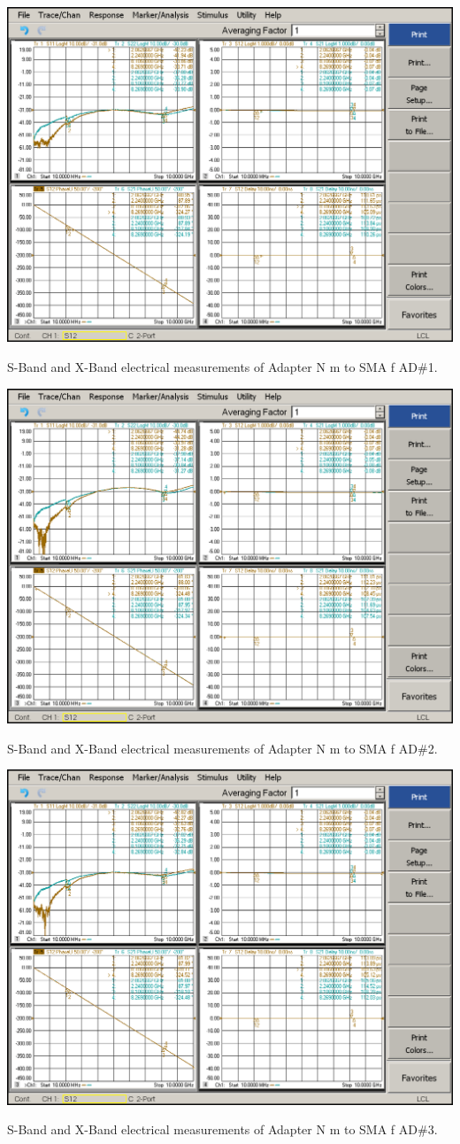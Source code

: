 \begin{table}[H]
	\centering
	\includegraphics[width=0.8\linewidth]{figuras/measures/AdapterNm-SMAf-1_10M_10G}
	\caption{S-Band and X-Band electrical measurements of Adapter N m to SMA f AD\#1.}
	\label{fig:AdapterNm-SMAf-1}
\end{table}

\begin{table}[H]
	\centering
	\includegraphics[width=0.8\linewidth]{figuras/measures/AdapterNm-SMAf-2_10M_10G}
	\caption{S-Band and X-Band electrical measurements of Adapter N m to SMA f AD\#2.}
	\label{fig:AdapterNm-SMAf-2}
\end{table}

\begin{table}[H]
	\centering
	\includegraphics[width=0.8\linewidth]{figuras/measures/AdapterNm-SMAf-3_10M_10G}
	\caption{S-Band and X-Band electrical measurements of Adapter N m to SMA f AD\#3.}
	\label{fig:AdapterNm-SMAf-3}
\end{table}

